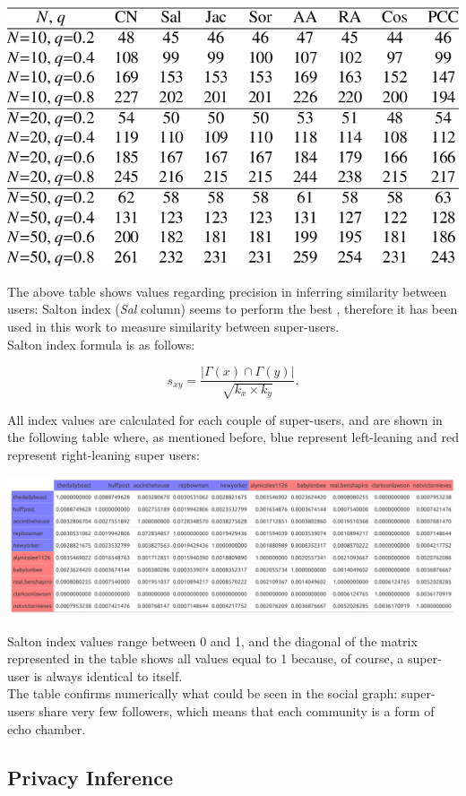\aCapo{}
\includegraphics[width = .5\textwidth]{images/salton_precision.png}

The above table shows values regarding precision in inferring similarity between users: Salton index (\textit{Sal} column) seems to perform the best \cite{10.1016/j.phpro.2010.07.033}, therefore it has been used in this work to measure similarity between super-users.\\
Salton index formula is as follows: 

$$s_{xy}=\frac{|\Gamma(x)\cap\Gamma(y)|}{\sqrt{k_x\times k_y}}.$$

All index values are calculated for each couple of super-users, and are shown in the following table where, as mentioned before, blue represent left-leaning and red represent right-leaning super users: 

\aCapo{}
\includegraphics[width = .5\textwidth]{images/final_salton_matrix.png}

Salton index values range between 0 and 1, and the diagonal of the matrix represented in the table shows all values equal to 1 because, of course, a super-user is always identical to itself.\\
The table confirms numerically what could be seen in the social graph: super-users share very few followers, which means that each community is a form of echo chamber.

\subsection{Privacy Inference}
